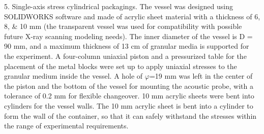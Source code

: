 \begin{digest}
    5. Single-axis stress cylindrical packagings. The vessel was designed using SOLIDWORKS software and made of acrylic sheet material with a thickness of \numlist{6;8;10} \unit{\milli\meter} (the transparent vessel was used for compatibility with possible future X-ray scanning modeling needs). The inner diameter of the vessel is D = 90 \unit{\milli\meter}, and a maximum thickness of 13 \unit{\centi\meter} of granular media is supported for the experiment. A four-column uniaxial piston and a pressurized table for the placement of the metal blocks were set up to apply uniaxial stresses to the granular medium inside the vessel. A hole of $\varphi$=19 \unit{\milli\meter} was left in the center of the piston and the bottom of the vessel for mounting the acoustic probe, with a tolerance of 0.2 \unit{\milli\meter} for flexible changeover. 10 \unit{\milli\meter} acrylic sheets were bent into cylinders for the vessel walls. The 10 \unit{\milli\meter} acrylic sheet is bent into a cylinder to form the wall of the container, so that it can safely withstand the stresses within the range of experimental requirements.



\end{digest}
